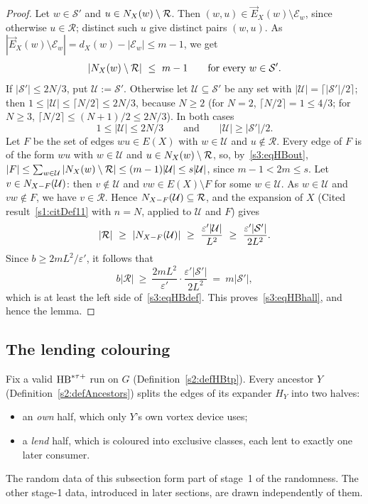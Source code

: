 \begin{proof}
Let $w\in\mathcal S'$ and $u\in N_X(w)\setminus\mathcal R$. Then
$(w,u)\in\vec E_X(w)\setminus\mathcal E_w$, since otherwise
$u\in\mathcal R$; distinct such $u$ give distinct pairs $(w,u)$. As
$|\vec E_X(w)\setminus\mathcal E_w|=d_X(w)-|\mathcal E_w|\le m-1$, we get
\begin{equation}\label{s3:eqHBout}
|N_X(w)\setminus\mathcal R|\ \le\ m-1\qquad\text{for every }w\in\mathcal S'.
\end{equation}
If $|\mathcal S'|\le2N/3$, put $\mathcal U:=\mathcal S'$. Otherwise let
$\mathcal U\subseteq\mathcal S'$ be any set with
$|\mathcal U|=\lceil|\mathcal S'|/2\rceil$; then
$1\le|\mathcal U|\le\lceil N/2\rceil\le2N/3$, because $N\ge2$ (for $N=2$,
$\lceil N/2\rceil=1\le4/3$; for $N\ge3$, $\lceil N/2\rceil\le(N+1)/2\le2N/3$).
In both cases
\[
1\le|\mathcal U|\le2N/3\qquad\text{and}\qquad|\mathcal U|\ge|\mathcal S'|/2 .
\]
Let $F$ be the set of edges $wu\in E(X)$ with $w\in\mathcal U$ and
$u\notin\mathcal R$. Every edge of $F$ is of the form $wu$ with
$w\in\mathcal U$ and $u\in N_X(w)\setminus\mathcal R$, so,
by~\eqref{s3:eqHBout},
$|F|\le\sum_{w\in\mathcal U}|N_X(w)\setminus\mathcal R|\le(m-1)|\mathcal U|\le s|\mathcal U|$,
since $m-1<2m\le s$. Let $v\in N_{X-F}(\mathcal U)$: then
$v\notin\mathcal U$ and $vw\in E(X)\setminus F$ for some $w\in\mathcal U$.
As $w\in\mathcal U$ and $vw\notin F$, we have $v\in\mathcal R$. Hence
$N_{X-F}(\mathcal U)\subseteq\mathcal R$, and the expansion of $X$
(Cited result~\ref{s1:citDef11} with $n=N$, applied to $\mathcal U$ and
$F$) gives
\[
|\mathcal R|\ \ge\ |\Nbr_{X-F}(\mathcal U)|\ \ge\ \frac{\varepsilon'|\mathcal U|}{L^2}\ \ge\ \frac{\varepsilon'|\mathcal S'|}{2L^2}.
\]
Since $b\ge2mL^2/\varepsilon'$, it follows that
\[
b|\mathcal R|\ \ge\ \frac{2mL^2}{\varepsilon'}\cdot\frac{\varepsilon'|\mathcal S'|}{2L^2}\ =\ m|\mathcal S'| ,
\]
which is at least the left side of~\eqref{s3:eqHBdef}. This
proves~\eqref{s3:eqHBhall}, and hence the lemma.
\end{proof}

\subsection{The lending colouring}

Fix a valid $\mathrm{HB}^{*\tau{+}}$ run on $G$ (Definition~\ref{s2:defHBtp}). Every
ancestor $Y$ (Definition~\ref{s2:defAncestors}) splits the edges of its
expander $H_Y$ into two halves:
\begin{itemize}
\item an \emph{own} half, which only $Y$'s own vortex device uses;
\item a \emph{lend} half, which is coloured into exclusive classes, each
  lent to exactly one later consumer.
\end{itemize}
The random data of this subsection form part of stage~1 of the
randomness. The other stage-1 data, introduced in later sections, are
drawn independently of them.

